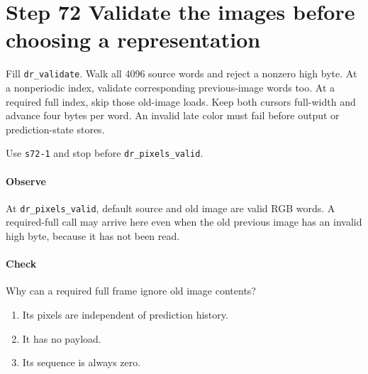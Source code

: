 \section{Step 72 Validate the images before choosing a representation}
Fill \texttt{dr\_validate}. Walk all 4096 source words and reject a nonzero high byte. At a nonperiodic index, validate corresponding previous-image words too. At a required full index, skip those old-image loads. Keep both cursors full-width and advance four bytes per word. An invalid late color must fail before output or prediction-state stores.

Use \texttt{s72-1} and stop before \texttt{dr\_pixels\_valid}.

\paragraph{Observe} At \texttt{dr\_pixels\_valid}, default source and old image are valid RGB words. A required-full call may arrive here even when the old previous image has an invalid high byte, because it has not been read.

\paragraph{Check} Why can a required full frame ignore old image contents?
\begin{enumerate}[label=\Alph*.]
\item Its pixels are independent of prediction history.
\item It has no payload.
\item Its sequence is always zero.
\end{enumerate}
